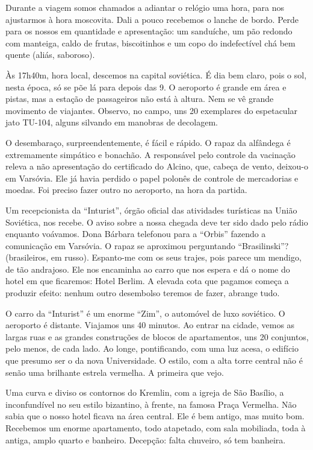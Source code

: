 Durante a viagem somos chamados a adiantar o relógio uma hora, para nos ajustarmos à hora moscovita. Dali a pouco recebemos o lanche de bordo. Perde para os nossos em quantidade e apresentação: um sanduíche, um pão redondo com manteiga, caldo de frutas, biscoitinhos e um copo do indefectível chá bem quente (aliás, saboroso).

Às 17h40m, hora local, descemos na capital soviética. É dia bem claro, pois o sol, nesta época, só se põe lá para depois das 9. O aeroporto é grande em área e pistas, mas a estação de passageiros não está à altura. Nem se vê grande movimento de viajantes. Observo, no campo, uns 20 exemplares do espetacular jato TU-104, alguns silvando em manobras de decolagem.

O desembaraço, surpreendentemente, é fácil e rápido. O rapaz da alfândega é extremamente simpático e bonachão. A responsável pelo controle da vacinação releva a não apresentação do certificado do Alcino, que, cabeça de vento, deixou-o em Varsóvia. Ele já havia perdido o papel polonês de controle de mercadorias e moedas. Foi preciso fazer outro no aeroporto, na hora da partida.

Um recepcionista da ``Inturist'', órgão oficial das atividades turísticas na União Soviética, nos recebe. O aviso sobre a nossa chegada deve ter sido dado pelo rádio enquanto voávamos. Dona Bárbara telefonou para a ``Orbis'' fazendo a comunicação em Varsóvia. O rapaz se aproximou perguntando ``Brasilinski''? (brasileiros, em russo). Espanto-me com os seus trajes, pois parece um mendigo, de tão andrajoso. Ele nos encaminha ao carro que nos espera e dá o nome do hotel em que ficaremos: Hotel Berlim. A elevada cota que pagamos começa a produzir efeito: nenhum outro desembolso teremos de fazer, abrange tudo.

O carro da ``Inturist'' é um enorme ``Zim'', o automóvel de luxo soviético. O aeroporto é distante. Viajamos uns 40 minutos. Ao entrar na cidade, vemos as largas ruas e as grandes construções de blocos de apartamentos, uns 20 conjuntos, pelo menos, de cada lado. Ao longe, pontificando, com uma luz acesa, o edifício que presumo ser o da nova Universidade. O estilo, com a alta torre central não é senão uma brilhante estrela vermelha. A primeira que vejo.

Uma curva e diviso os contornos do Kremlin, com a igreja de São Basílio, a inconfundível no seu estilo bizantino, à frente, na famosa Praça Vermelha. Não sabia que o nosso hotel ficava na área central. Ele é bem antigo, mas muito bom. Recebemos um enorme apartamento, todo atapetado, com sala mobiliada, toda à antiga, amplo quarto e banheiro. Decepção: falta chuveiro, só tem banheira.

